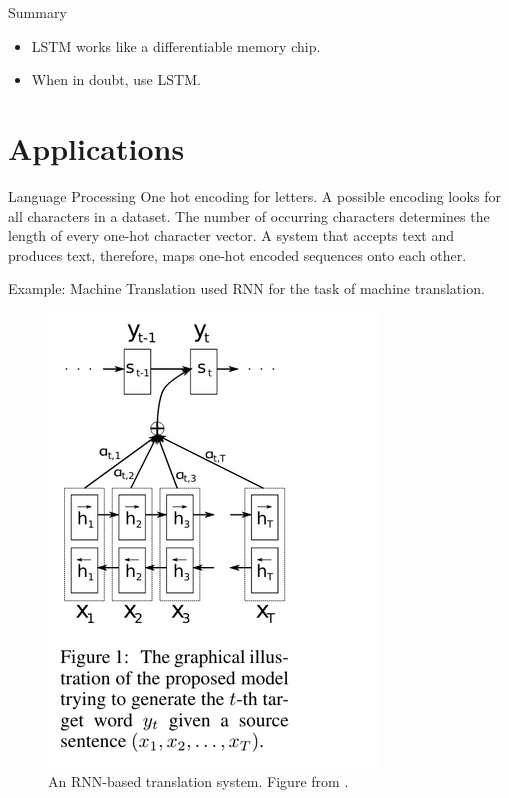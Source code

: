 \documentclass{beamer}
\begin{document}
    \begin{frame}{Summary}
      \begin{itemize}
        \item LSTM works like a differentiable memory chip.
        \item When in doubt, use LSTM.
      \end{itemize}
    \end{frame}

    \section{Applications}
    \begin{frame}{Language Processing}
      One hot encoding for letters. A possible encoding looks for all characters in a dataset.
      The number of occurring characters determines the length of every one-hot character vector.
      A system that accepts text and produces text, therefore, maps one-hot encoded sequences onto each other.
    \end{frame}


    \begin{frame}{Example: Machine Translation}
      \cite{Bahdanau2015NeuralMT} used RNN for the task of machine translation.
      \begin{figure}
      \includegraphics[scale=0.3]{./figures/translation.png}
      \caption{An RNN-based translation system. Figure from \cite{Bahdanau2015NeuralMT}.}
      \end{figure}
    \end{frame}
\end{document}
